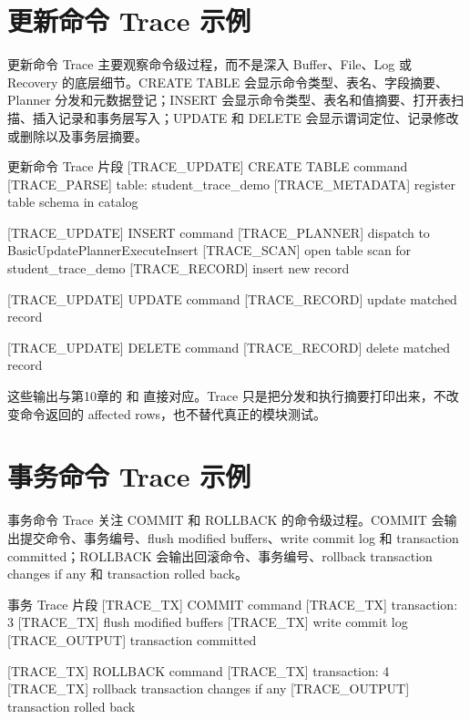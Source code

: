 \section{更新命令 Trace 示例}
\label{sec:trace-update}

更新命令 Trace 主要观察命令级过程，而不是深入 Buffer、File、Log 或 Recovery 的底层细节。CREATE TABLE 会显示命令类型、表名、字段摘要、Planner 分发和元数据登记；INSERT 会显示命令类型、表名和值摘要、打开表扫描、插入记录和事务层写入；UPDATE 和 DELETE 会显示谓词定位、记录修改或删除以及事务层摘要。

\begin{dbcode}{更新命令 Trace 片段}
[TRACE_UPDATE] CREATE TABLE command
[TRACE_PARSE]   table: student_trace_demo
[TRACE_METADATA] register table schema in catalog

[TRACE_UPDATE] INSERT command
[TRACE_PLANNER] dispatch to BasicUpdatePlannerExecuteInsert
[TRACE_SCAN] open table scan for student_trace_demo
[TRACE_RECORD] insert new record

[TRACE_UPDATE] UPDATE command
[TRACE_RECORD] update matched record

[TRACE_UPDATE] DELETE command
[TRACE_RECORD] delete matched record
\end{dbcode}

这些输出与第10章的  和  直接对应。Trace 只是把分发和执行摘要打印出来，不改变命令返回的 affected rows，也不替代真正的模块测试。

\section{事务命令 Trace 示例}
\label{sec:trace-tx}

事务命令 Trace 关注 COMMIT 和 ROLLBACK 的命令级过程。COMMIT 会输出提交命令、事务编号、flush modified buffers、write commit log 和 transaction committed；ROLLBACK 会输出回滚命令、事务编号、rollback transaction changes if any 和 transaction rolled back。

\begin{dbcode}{事务 Trace 片段}
[TRACE_TX] COMMIT command
[TRACE_TX] transaction: 3
[TRACE_TX] flush modified buffers
[TRACE_TX] write commit log
[TRACE_OUTPUT] transaction committed

[TRACE_TX] ROLLBACK command
[TRACE_TX] transaction: 4
[TRACE_TX] rollback transaction changes if any
[TRACE_OUTPUT] transaction rolled back
\end{dbcode}

